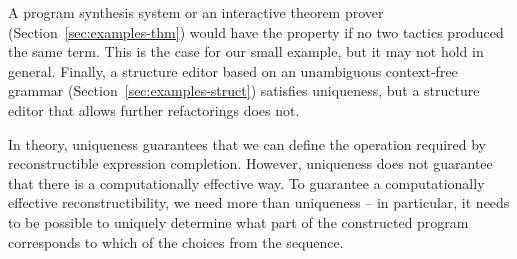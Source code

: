\documentclass[nonacm,anonymous,sigplan,screen]{acmart}
\newcommand{\ident}[1]{\textsf{\color{DarkSlateBlue}{#1}}}
\begin{document}
A program synthesis system or an interactive theorem prover (Section~\ref{sec:examples-thm})
would have the property if no two tactics produced the same term. This is the case for our small
example, but it may not hold in general. Finally, a structure editor based on an unambiguous
context-free grammar (Section~\ref{sec:examples-struct}) satisfies uniqueness, but a structure
editor that allows further refactorings does not.

In theory, uniqueness guarantees that we can define the \ident{decode} operation required
by reconstructible expression completion. However, uniqueness does not guarantee that there is
a computationally effective way.
To guarantee a computationally effective reconstructibility, we need more than
uniqueness -- in particular, it needs to be possible to uniquely determine what part of the
constructed program corresponds to which of the choices from the sequence.
\end{document}
